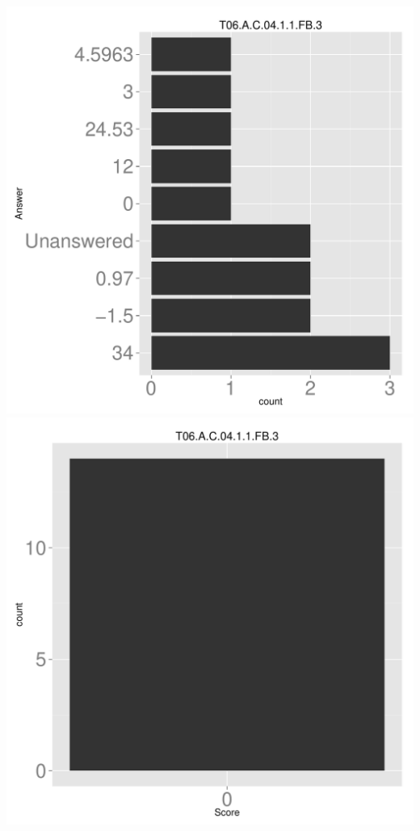 \documentclass[12pt,english,nohyper]{tufte-handout}\usepackage[]{graphicx}\usepackage[]{color}
\begin{document}
\begin{center} \includegraphics[width=.45\linewidth]{Topic06_AB_11_answer} \includegraphics[width=.45\linewidth]{Topic06_AB_11_score} \end{center} 
\end{document}
